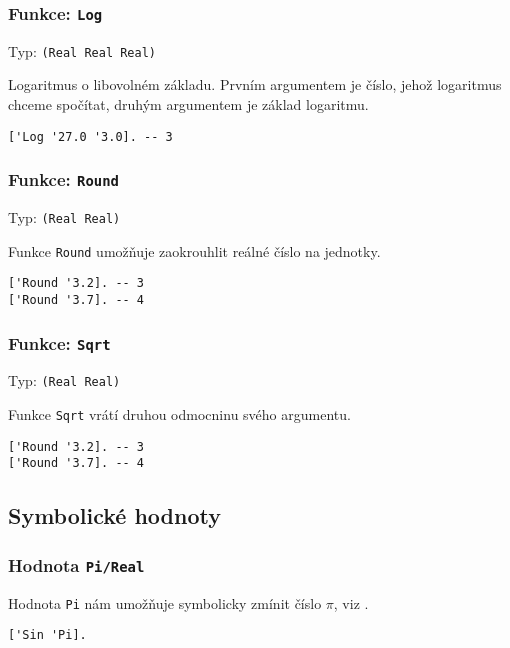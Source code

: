 \subsubsection*{Funkce: \lstinline{Log}}
Typ: \lstinline{(Real Real Real)}

Logaritmus o libovolném základu. Prvním argumentem je číslo, jehož logaritmus chceme spočítat,
druhým argumentem je základ logaritmu.

\begin{lstlisting}[caption={Ukázka využití Log}]
['Log '27.0 '3.0]. -- 3
\end{lstlisting}

\subsubsection*{Funkce: \lstinline{Round}}
Typ: \lstinline{(Real Real)}

Funkce \lstinline{Round} umožňuje zaokrouhlit reálné číslo na jednotky.

\begin{lstlisting}[caption={Ukázka využití Round}]
['Round '3.2]. -- 3
['Round '3.7]. -- 4
\end{lstlisting}

\subsubsection*{Funkce: \lstinline{Sqrt}}
Typ: \lstinline{(Real Real)}

Funkce \lstinline{Sqrt} vrátí druhou odmocninu svého argumentu.

\begin{lstlisting}[caption={Ukázka využití Round}]
['Round '3.2]. -- 3
['Round '3.7]. -- 4
\end{lstlisting}

\subsection{Symbolické hodnoty}

\subsubsection*{Hodnota \lstinline{Pi/Real}}

Hodnota \lstinline{Pi} nám umožňuje symbolicky zmínit číslo $\pi$, viz .

\begin{lstlisting}[caption={Ukázka využití Pi}]
['Sin 'Pi].
\end{lstlisting}

